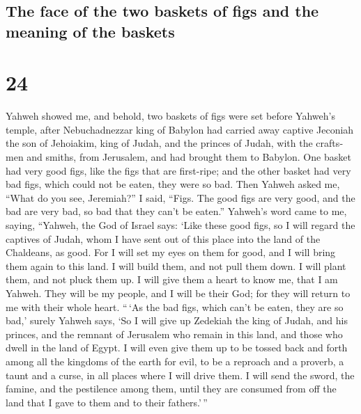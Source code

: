 \begin{paracol}{2}
\switchcolumn
\begin{otherlanguage}{english}

\hypertarget{the-face-of-the-two-baskets-of-figs-and-the-meaning-of-the-baskets}{%
\subsection{The face of the two baskets of figs and the meaning of the
baskets}\label{the-face-of-the-two-baskets-of-figs-and-the-meaning-of-the-baskets}}

\hypertarget{section-47}{%
\section{24}\label{section-47}}

 Yahweh showed me, and behold, two baskets of figs were
set before Yahweh's temple, after Nebuchadnezzar king of Babylon had
carried away captive Jeconiah the son of Jehoiakim, king of Judah, and
the princes of Judah, with the craftsmen and smiths, from Jerusalem, and
had brought them to Babylon.  One basket had very good
figs, like the figs that are first-ripe; and the other basket had very
bad figs, which could not be eaten, they were so bad. 
Then Yahweh asked me, ``What do you see, Jeremiah?'' I said, ``Figs. The
good figs are very good, and the bad are very bad, so bad that they
can't be eaten.''  Yahweh's word came to me, saying,
 ``Yahweh, the God of Israel says: `Like these good figs,
so I will regard the captives of Judah, whom I have sent out of this
place into the land of the Chaldeans, as good.  For I will
set my eyes on them for good, and I will bring them again to this land.
I will build them, and not pull them down. I will plant them, and not
pluck them up.  I will give them a heart to know me, that
I am Yahweh. They will be my people, and I will be their God; for they
will return to me with their whole heart.  ``\,`As the bad
figs, which can't be eaten, they are so bad,' surely Yahweh says, `So I
will give up Zedekiah the king of Judah, and his princes, and the
remnant of Jerusalem who remain in this land, and those who dwell in the
land of Egypt.  I will even give them up to be tossed back
and forth among all the kingdoms of the earth for evil, to be a reproach
and a proverb, a taunt and a curse, in all places where I will drive
them.  I will send the sword, the famine, and the
pestilence among them, until they are consumed from off the land that I
gave to them and to their fathers.'\,''


\end{otherlanguage}
\end{paracol}
